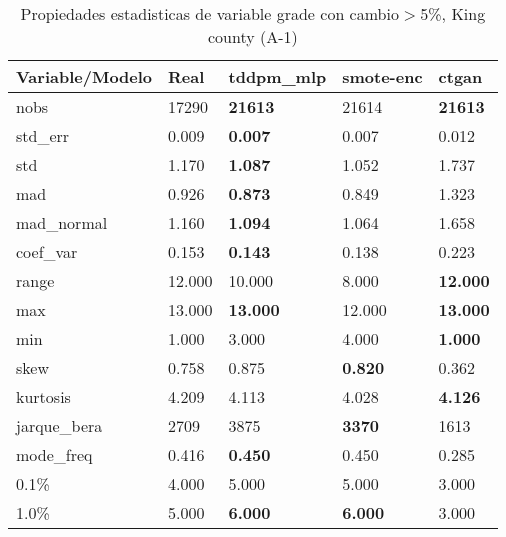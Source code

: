 \begin{table}[H]
\centering
\fontsize{8}{14}\selectfont
\caption{Propiedades estadisticas de variable grade con cambio\ensuremath{>}5\%, King county (A-1)}
\label{table-stats-king county-a-1-grade-short}
\begin{tabular}{|l|m{10em}|m{10em}|m{10em}|m{10em}|}
\hline
 \rowcolor[gray]{0.8}
Variable/Modelo & Real & tddpm\_mlp & smote-enc & ctgan \\
\hline nobs & 17290 & \bfseries 21613 & \cellcolor[rgb]{0.9, 0.54, 0.52} 21614 & \bfseries 21613 \\
\hline std\_err & 0.009 & \bfseries 0.007 & 0.007 & \cellcolor[rgb]{0.9, 0.54, 0.52} 0.012 \\
\hline std & 1.170 & \bfseries 1.087 & 1.052 & \cellcolor[rgb]{0.9, 0.54, 0.52} 1.737 \\
\hline mad & 0.926 & \bfseries 0.873 & 0.849 & \cellcolor[rgb]{0.9, 0.54, 0.52} 1.323 \\
\hline mad\_normal & 1.160 & \bfseries 1.094 & 1.064 & \cellcolor[rgb]{0.9, 0.54, 0.52} 1.658 \\
\hline coef\_var & 0.153 & \bfseries 0.143 & 0.138 & \cellcolor[rgb]{0.9, 0.54, 0.52} 0.223 \\
\hline range & 12.000 & 10.000 & \cellcolor[rgb]{0.9, 0.54, 0.52} 8.000 & \bfseries 12.000 \\
\hline max & 13.000 & \bfseries 13.000 & \cellcolor[rgb]{0.9, 0.54, 0.52} 12.000 & \bfseries 13.000 \\
\hline min & 1.000 & 3.000 & \cellcolor[rgb]{0.9, 0.54, 0.52} 4.000 & \bfseries 1.000 \\
\hline skew & 0.758 & 0.875 & \bfseries 0.820 & \cellcolor[rgb]{0.9, 0.54, 0.52} 0.362 \\
\hline kurtosis & 4.209 & 4.113 & \cellcolor[rgb]{0.9, 0.54, 0.52} 4.028 & \bfseries 4.126 \\
\hline jarque\_bera & 2709 & \cellcolor[rgb]{0.9, 0.54, 0.52} 3875 & \bfseries 3370 & 1613 \\
\hline mode\_freq & 0.416 & \bfseries 0.450 & 0.450 & \cellcolor[rgb]{0.9, 0.54, 0.52} 0.285 \\
\hline 0.1\% & 4.000 & 5.000 & 5.000 & 3.000 \\
\hline 1.0\% & 5.000 & \bfseries 6.000 & \bfseries 6.000 & \cellcolor[rgb]{0.9, 0.54, 0.52} 3.000 \\
\hline
\end{tabular}
\end{table}
